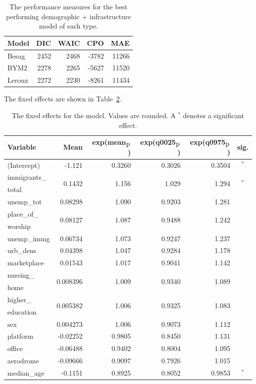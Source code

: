 \begin{table}[H] 
\caption{The performance measures for the best performing demographic + infrastructure model of each type. \label{allNorway}}
\begin{tabular}{l r r r r}
\toprule
\textbf{Model}	& \textbf{DIC}	& \textbf{WAIC} & \textbf{CPO} & \textbf{MAE} \\
\midrule
Besag  & 2452 & 2468 & -3782 & 11266 \\
BYM2 & 2278 & 2265 & -5627 & 11520\\
Leroux &  2272 & 2230 & -8261 & 11434\\
\bottomrule
\end{tabular}
\end{table}
The fixed effects are shown in Table~\ref{fixedAllNorway_spatial}.
\begin{table}[H]
\caption{The fixed effects for the model. Values are rounded. A $^*$ denotes a significant effect. \label{fixedAllNorway_spatial}}
\begin{tabular}{l r r r r c}
\toprule
\textbf{Variable}	& \textbf{Mean}	& \textbf{exp(mean$_{\hbox{p}}$)} & \textbf{exp(q0025$_{\hbox{p}}$)} & \textbf{exp(q0975$_{\hbox{p}}$)} & \textbf{sig.}\\
\midrule
(Intercept) & -1.121 & 0.3260 & 0.3026 & 0.3504 & $^*$ \\
immigrants\_ & \multirow{2}{*}{0.1432} & \multirow{2}{*}{1.156} & \multirow{2}{*}{1.029} & \multirow{2}{*}{1.294} & \multirow{2}{*}{$^*$} \\
total \\
unemp\_tot & 0.08298 & 1.090 & 0.9203 & 1.281 \\
place\_of\_ & \multirow{2}{*}{0.08127} & \multirow{2}{*}{1.087} & \multirow{2}{*}{0.9488} & \multirow{2}{*}{1.242} \\
worship \\
unemp\_immg & 0.06734 & 1.073 & 0.9247 & 1.237 & \\
urb\_dens & 0.04398 & 1.047 & 0.9284 & 1.178 \\
marketplace & 0.01543 & 1.017 & 0.9041 & 1.142 \\
nursing\_ & \multirow{2}{*}{0.008396} & \multirow{2}{*}{1.009} & \multirow{2}{*}{0.9340} & \multirow{2}{*}{1.089} \\
home \\
higher\_ & \multirow{2}{*}{0.005382} & \multirow{2}{*}{1.006} & \multirow{2}{*}{0.9325} & \multirow{2}{*}{1.083} \\
education\\
sex & 0.004273 & 1.006 & 0.9073 & 1.112\\
platform & -0.02252 & 0.9805 & 0.8450 & 1.131 \\
office & -0.06488 & 0.9402 & 0.8004 & 1.095 \\
aerodrome & -0.09666 & 0.9097 & 0.7926 & 1.015 \\
median\_age & -0.1151  & 0.8925 & 0.8052 & 0.9853 & $^*$ \\
\bottomrule
\end{tabular}
\end{table}
\clearpage
